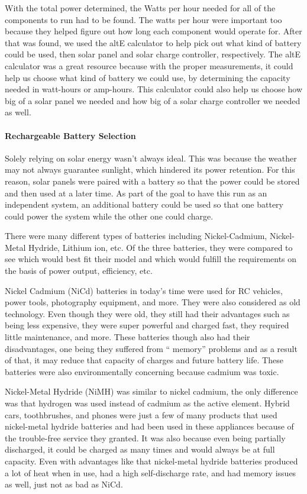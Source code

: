 With the total power determined, the Watts per hour needed for all of the components to run had to be found. The watts per hour were important too because they helped figure out how long each component would operate for. After that was found, we used the altE calculator to help pick out what kind of battery could be used, then solar panel and solar charge controller, respectively. The altE calculator was a great resource because with the proper measurements, it could help us choose what kind of battery we could use, by determining the capacity needed in watt-hours or amp-hours. This calculator could also help us choose how big of a solar panel we needed and how big of a solar charge controller we needed as well.
\paragraph{Rechargeable Battery Selection}
Solely relying on solar energy wasn’t always ideal. This was because the weather may not always guarantee sunlight, which hindered its power retention. For this reason, solar panels were paired with a battery so that the power could be stored and then used at a later time. As part of the goal to have this run as an independent system, an additional battery could be used so that one battery could power the system while the other one could charge.

There were many different types of batteries including Nickel-Cadmium, Nickel-Metal Hydride, Lithium ion, etc. Of the three batteries, they were compared to see which would best fit their model and which would fulfill the requirements on the basis of power output, efficiency, etc.

Nickel Cadmium (NiCd) batteries in today’s time were used for RC vehicles, power tools, photography equipment, and more. They were also considered as old technology. Even though they were old, they still had their advantages such as being less expensive, they were super powerful and charged fast, they required little maintenance, and more. These batteries though also had their disadvantages, one being they suffered from “ memory” problems and as a result of that, it may reduce that capacity of charges and future battery life. These batteries were also environmentally concerning because cadmium was toxic.

Nickel-Metal Hydride (NiMH) was similar to nickel cadmium, the only difference was that hydrogen was used instead of cadmium as the active element. Hybrid cars, toothbrushes, and phones were just a few of many products that used nickel-metal hydride batteries and had been used in these appliances because of the trouble-free service they granted. It was also because even being partially discharged, it could be charged as many times and would always be at full capacity. Even with advantages like that nickel-metal hydride batteries produced a lot of heat when in use, had a high self-discharge rate, and had memory issues as well, just not as bad as NiCd.

